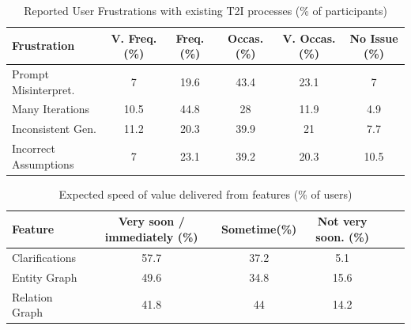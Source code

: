 \begin{table}[h]
\caption{Reported User Frustrations with existing T2I processes (\% of participants)}
\centering
\small
\begin{tabular}{lccccc} %
\toprule
\textbf{Frustration} & \textbf{V. Freq. (\%)} & \textbf{Freq. (\%)} & \textbf{Occas. (\%)} & \textbf{V. Occas. (\%)} & \textbf{No Issue (\%)} \\ %
\midrule
Prompt Misinterpret. & 7 & 19.6 & 43.4 & 23.1 & 7 \\  %
Many Iterations & 10.5 & 44.8 & 28 & 11.9 & 4.9 \\ %
Inconsistent Gen. & 11.2 & 20.3 & 39.9 & 21 & 7.7 \\ %
Incorrect Assumptions & 7 & 23.1 & 39.2 & 20.3 & 10.5 \\ %
\bottomrule
\end{tabular}
\label{table_frustration1}  %
\end{table}


\begin{table}[h]
\caption{Expected speed of value delivered from features (\% of users)}
\centering
\small
\begin{tabular}{lccccc} %
\toprule
\textbf{Feature} & \textbf{Very soon / immediately (\%)} & \textbf{Sometime(\%)} & \textbf{Not very soon. (\%)}
\\ %
\midrule
Clarifications & 57.7 & 37.2 & 5.1 \\  %
Entity Graph & 49.6 & 34.8 & 15.6 \\ %
Relation Graph & 41.8 & 44 & 14.2 \\ %
\bottomrule
\end{tabular}
\label{table_frustration2}  %
\end{table}


